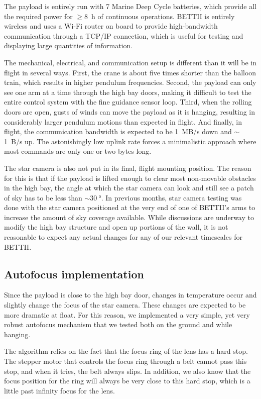The payload is entirely run with 7 Marine Deep Cycle batteries, which provide all the required power for $\ge$\SI{8}{\hour} of continuous operations. BETTII is entirely wireless and uses a Wi-Fi router on board to provide high-bandwidth communication through a TCP/IP connection, which is useful for testing and displaying large quantities of information.

The mechanical, electrical, and communication setup is different than it will be in flight in several ways. First, the crane is about five times shorter than the balloon train, which results in higher pendulum frequencies. Second, the payload can only see one arm at a time through the high bay doors, making it difficult to test the entire control system with the fine guidance sensor loop. Third, when the rolling doors are open, gusts of winds can move the payload as it is hanging, resulting in considerably larger pendulum motions than expected in flight. And finally, in flight, the communication bandwidth is expected to be 1~MB/s down and $\sim$1~B/s up. The astonishingly low uplink rate forces a minimalistic approach where most commands are only one or two bytes long. 

The star camera is also not put in its final, flight mounting position. The reason for this is that if the payload is lifted enough to clear most non-movable obstacles in the high bay, the angle at which the star camera can look and still see a patch of sky has to be less than $\sim \SI{30}{\degree}$. In previous months, star camera testing was done with the star camera positioned at the very end of one of BETTII's arms to increase the amount of sky coverage available. While discussions are underway to modify the high bay structure and open up portions of the wall, it is not reasonable to expect any actual changes for any of our relevant timescales for BETTII.


\subsection{Autofocus implementation}

Since the payload is close to the high bay door, changes in temperature occur and slightly change the focus of the star camera. These changes are expected to be more dramatic at float. For this reason, we implemented a very simple, yet very robust autofocus mechanism that we tested both on the ground and while hanging.

The algorithm relies on the fact that the focus ring of the lens has a hard stop. The stepper motor that controls the focus ring through a belt cannot pass this stop, and when it tries, the belt always slips. In addition, we also know that the focus position for the ring will always be very close to this hard stop, which is a little past infinity focus for the lens. 

